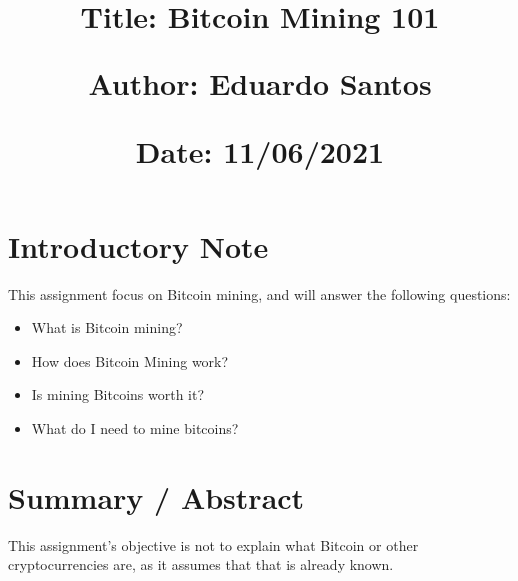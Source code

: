 \documentclass{article}
\newcommand\tab[1][1cm]{\hspace*{#1}}
\begin{document}
\title{\vspace{-0.9cm}
       \vspace{1cm}
       \normalsize
       \raggedright\textbf{Title: \hspace{1.5cm} Bitcoin Mining 101} \\ \vspace{0.4cm}
       \raggedright\textbf{Author: \hspace{1.1cm} Eduardo Santos} \\ \vspace{0.4cm}
       \raggedright\textbf{Date: \hspace{1.47cm} 11/06/2021} \\}
\author{}
\date{}

\maketitle
\thispagestyle{fancy}


\vspace{-1.4cm}

\tableofcontents


\fontsize{10pt}{13pt}
\selectfont
\lsstyle


\newpage

\section{Introductory Note}

\tab This assignment focus on Bitcoin mining, and will answer the following questions:

\begin{itemize}
    \item What is Bitcoin mining?
    \item How does Bitcoin Mining work?
    \item Is mining Bitcoins worth it?
    \item What do I need to mine bitcoins?
\end{itemize}
\tab 

\section{Summary / Abstract}

\tab This assignment's objective is not to explain what Bitcoin or other cryptocurrencies are, as it assumes that that is already known. 
\end{document}
